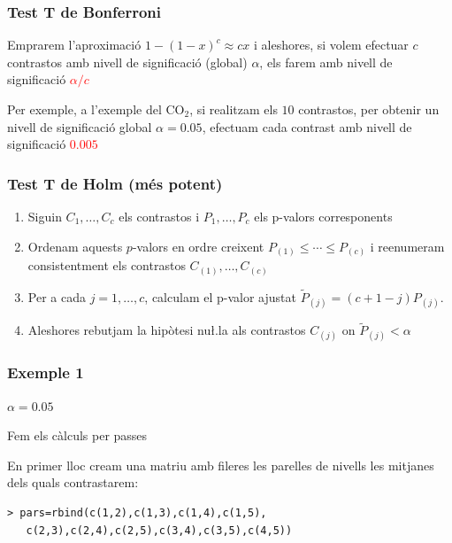 \documentclass[12pt,t]{beamer}
\newcommand{\red}[1]{\textcolor{red}{#1}}
\renewcommand{\emph}[1]{{\color{red}#1}}
\renewcommand{\leq}{\leqslant}
\theoremstyle{plain}
\theoremstyle{definition}
\begin{document}
\begin{frame}
\frametitle{Test T de Bonferroni}
Emprarem l'aproximació $1-(1-x)^c \approx cx$ i aleshores, si volem efectuar $c$ contrastos amb nivell de significació (global) $\alpha$, els farem amb nivell de significació \red{$\alpha/c$}
\bigskip

Per exemple,  a l'exemple del CO${}_2$, si realitzam els  $10$ contrastos, per obtenir un nivell de significació global  $\alpha =0.05$, efectuam cada contrast amb nivell de significació
\red{$0.005$}
\end{frame}



\begin{frame}
\frametitle{Test T de Holm (més potent)}
\vspace*{-2ex}

\begin{enumerate}
\item Siguin $C_{1},\ldots ,C_{c}$ els contrastos i $P_{1},\ldots ,P_{c}$ els p-valors corresponents
\medskip

\item Ordenam aquests $p$-valors en ordre creixent $P_{(1)}\leq \cdots\leq P_{(c)}$ i reenumeram consistentment els contrastos $C_{(1)},\ldots, C_{(c)}$
\medskip

\item Per a cada $j=1,\ldots,c$, calculam el \emph{p-valor ajustat} $\widetilde{P}_{(j)}=(c+1-j)P_{(j)}$.
\medskip

\item Aleshores rebutjam la hipòtesi nu\l.la als contrastos $C_{(j)}$ on $\widetilde{P}_{(j)}<\alpha$
 \end{enumerate}


\end{frame}



\begin{frame}[fragile]
\frametitle{Exemple 1}
$\alpha=0.05$
\medskip


Fem els càlculs per passes
\medskip

En primer lloc cream una matriu amb fileres les parelles de nivells les mitjanes dels quals contrastarem:

 \begin{verbatim}
> pars=rbind(c(1,2),c(1,3),c(1,4),c(1,5),
   c(2,3),c(2,4),c(2,5),c(3,4),c(3,5),c(4,5))
\end{verbatim}

\end{frame}
\end{document}
